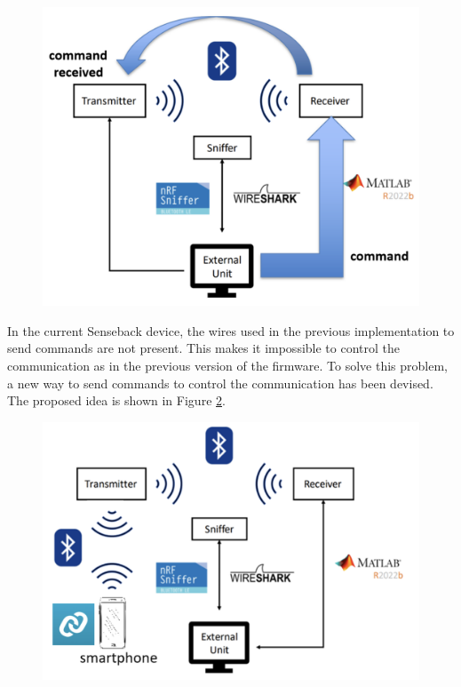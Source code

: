 \documentclass{Configuration_Files/PoliMi3i_thesis}
\begin{document}
\begin{figure}[H]
    \centering
    \includegraphics[scale=0.3]{Multicentral/1.png}
    \label{fig:user_command_sending_procedure}
\end{figure}

In the current Senseback device, the wires used in the previous implementation to send commands are not present. This makes it impossible to control the communication as in the previous version of the firmware. To solve this problem, a new way to send commands to control the communication has been devised. The proposed idea is shown in Figure \ref{fig:multicentral_implementation}.


\begin{figure}[H]
    \centering
    \includegraphics[scale=0.3]{Multicentral/2.png}
    \label{fig:multicentral_implementation}
\end{figure}
\end{document}
